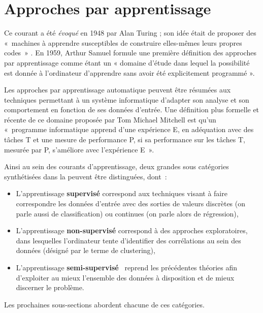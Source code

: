 \section{Approches par apprentissage}
\label{sec:machine_learning}
Ce courant a été \textit{évoqué} en 1948 par Alan Turing ; son idée était de proposer des «~machines à apprendre susceptibles de construire elles-mêmes leurs propres codes~» \cite{Turing1950}. En 1959, Arthur Samuel formule une première définition des approches par apprentissage comme étant un « domaine d’étude dans lequel la possibilité est donnée à l’ordinateur d’apprendre sans avoir été explicitement programmé ».\par 

Les approches par apprentissage automatique peuvent être résumées aux techniques permettant à un système informatique d’adapter son analyse et son comportement en fonction de ses données d’entrée. Une définition plus formelle et récente de ce domaine proposée par Tom Michael Mitchell est qu’un «~programme informatique apprend d’une expérience E, en adéquation avec des tâches T et une mesure de performance P, si sa performance sur les tâches T, mesurée par P, s’améliore avec l’expérience E~».\par

Ainsi au sein des courants d’apprentissage, deux grandes sous catégories synthétisées dans la  peuvent être distinguées, dont~: 
\begin{itemize}
    \item L'apprentissage \textbf{supervisé} correspond aux techniques visant à faire correspondre les données d'entrée avec des sorties de valeurs discrètes (on parle aussi de classification) ou continues (on parle alors de régression),
    \item L'apprentissage \textbf{non-supervisé} correspond à des approches exploratoires, dans lesquelles l'ordinateur tente d'identifier des corrélations au sein des données (désigné par le terme de clustering),
    \item L'apprentissage \textbf{semi-supervisé}~\cite{Murphy2012} reprend les précédentes théories afin d'exploiter au mieux l'ensemble des données à disposition et de mieux discerner le problème.
\end{itemize}

Les prochaines sous-sections abordent chacune de ces catégories.\par
 
